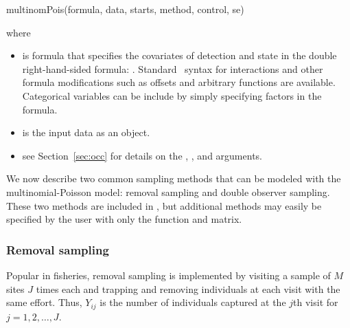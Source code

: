 \documentclass[article,shortnames]{jss}
\newcommand{\um}{\pkg{unmarked}}
\newcommand{\rlang}{\proglang{R}}
\begin{document}
\begin{Code}
multinomPois(formula, data, starts, method, control, se)
\end{Code}
where 
\begin{itemize}
\item {} is formula that specifies the covariates of
  detection and state in the double right-hand-sided formula: .  Standard \rlang\ syntax for
  interactions and other formula modifications such as offsets and
  arbitrary functions are available.  Categorical variables can be
  include by simply specifying factors in the formula.
\item {} is the input data as an
   object.
\item see Section~\ref{sec:occ} for details on the ,
  , and  arguments.
\end{itemize}

We now describe two common sampling methods that can be modeled
with the multinomial-Poisson model: removal sampling and double
observer sampling.  These two methods are included in \um, but
additional methods may easily be specified by the user with only the
 function and  matrix.

\subsubsection{Removal sampling}

Popular in fisheries, removal sampling is implemented by visiting a
sample of $M$ sites $J$ times each and trapping and removing
individuals at each visit with the same effort.  Thus, $Y_{ij}$ is the
number of individuals captured at the $j$th visit for $j=1,2,\dots,J$.
\end{document}
